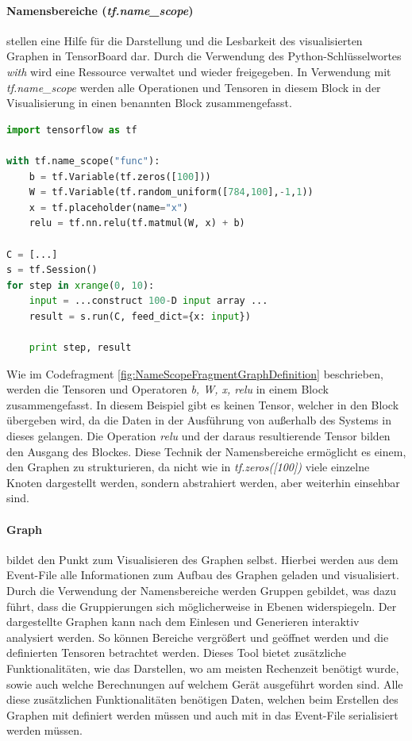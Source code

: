 \paragraph{Namensbereiche (\textit{tf.name\_scope})} stellen eine Hilfe für die Darstellung und die Lesbarkeit des visualisierten Graphen in TensorBoard dar. 
Durch die Verwendung des Python-Schlüsselwortes \textit{with} wird eine Ressource verwaltet und wieder freigegeben. 
In Verwendung mit \textit{tf.name\_scope} werden alle Operationen und Tensoren in diesem Block in der Visualisierung in einen benannten Block zusammengefasst.
\begin{lstlisting}[caption={TensorFlow Codefragment zur Namescope Verwendung in Graphen},label=fig:NameScopeFragmentGraphDefinition,captionpos=b,language=Python]
import tensorflow as tf

with tf.name_scope("func"):
	b = tf.Variable(tf.zeros([100])) 
	W = tf.Variable(tf.random_uniform([784,100],-1,1)) 
	x = tf.placeholder(name="x") 
	relu = tf.nn.relu(tf.matmul(W, x) + b) 

C = [...] 
s = tf.Session()
for step in xrange(0, 10):
	input = ...construct 100-D input array ... 
	result = s.run(C, feed_dict={x: input}) 

	print step, result 
\end{lstlisting}
Wie im Codefragment \ref{fig:NameScopeFragmentGraphDefinition} beschrieben, werden die Tensoren und Operatoren \textit{b, W, x, relu} in einem Block zusammengefasst. 
In diesem Beispiel gibt es keinen Tensor, welcher in den Block übergeben wird, da die Daten in der Ausführung von außerhalb des Systems in dieses gelangen. 
Die Operation \textit{relu} und der daraus resultierende Tensor bilden den Ausgang des Blockes. 
Diese Technik der Namensbereiche ermöglicht es einem, den Graphen zu strukturieren, da nicht wie in \textit{tf.zeros([100])} viele einzelne Knoten dargestellt werden, sondern abstrahiert werden, aber weiterhin einsehbar sind.

\paragraph{Graph} bildet den Punkt zum Visualisieren des Graphen selbst. 
Hierbei werden aus dem Event-File alle Informationen zum Aufbau des Graphen geladen und visualisiert. 
Durch die Verwendung der Namensbereiche werden Gruppen gebildet, was dazu führt, dass die Gruppierungen sich möglicherweise in Ebenen widerspiegeln. 
Der dargestellte Graphen kann nach dem Einlesen und Generieren interaktiv analysiert werden. 
So können Bereiche vergrößert und geöffnet werden und die definierten Tensoren betrachtet werden. 
Dieses Tool bietet zusätzliche Funktionalitäten, wie das Darstellen, wo am meisten Rechenzeit benötigt wurde, sowie auch welche Berechnungen auf welchem Gerät ausgeführt worden sind. 
Alle diese zusätzlichen Funktionalitäten benötigen Daten, welchen beim Erstellen des Graphen mit definiert werden müssen und auch mit in das Event-File serialisiert werden müssen. 

